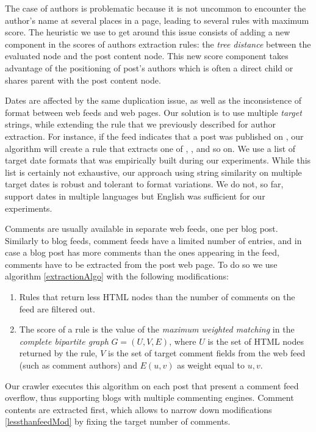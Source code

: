 The case of authors is problematic because it is not uncommon to encounter the author's name at several places in a page, leading to several rules with maximum score. The heuristic we use to get around this issue consists of adding a new component in the scores of authors extraction rules: the \emph{tree distance} between the evaluated node and the post content node. This new score component takes advantage of the positioning of post's authors which is often a direct child or shares parent with the post content node.

Dates are affected by the same duplication issue, as well as the inconsistence of format between web feeds and web pages. Our solution is to use multiple \emph{target} strings, while extending the rule that we previously described for author extraction. For instance, if the feed indicates that a post was published on
, our algorithm will create a rule that extracts one of , ,  and so on. We use a list of  target date formats that was empirically built during our experiments. While this list is certainly not exhaustive, our approach using string similarity on multiple target dates is robust and tolerant to format variations. We do not, so far, support dates in multiple languages but English was sufficient for our experiments.

Comments are usually available in separate web feeds, one per blog post. Similarly to blog feeds, comment feeds have a limited number of entries, and in case a blog post has more comments than the ones appearing in the feed, comments have to be extracted from the post web page. To do so we use algorithm \ref{extractionAlgo} with the following modifications:
\begin{enumerate}
  \item\label{lessthanfeedMod} Rules that return less HTML nodes than the number of comments on the feed are filtered out.
  \item\label{assignmentMod} The score of a rule is the value of the \emph{maximum weighted matching} in the \emph{complete bipartite graph} $G = (U, V, E)$, where $U$ is the set of HTML nodes returned by the rule, $V$ is the set of target comment fields from the web feed (such as comment authors) and $E(u, v)$ as weight equal to \code{\ref{similarityAlgo}(}$u, v$\code{)}.
\end{enumerate}
Our crawler executes this algorithm on each post that present a comment feed overflow, thus supporting blogs with multiple commenting engines. Comment contents are extracted first, which allows to narrow down modifications \ref{lessthanfeedMod} by fixing the target number of comments.
